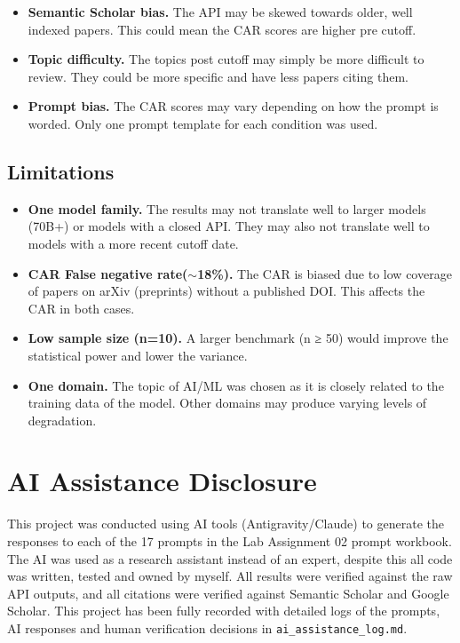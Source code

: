 \documentclass[conference]{IEEEtran}
\begin{document}
\begin{itemize}[leftmargin=,topsep=2pt]
\item \textbf{Semantic Scholar bias. } The API may be skewed towards older,
well indexed papers. This could mean the CAR scores are higher pre cutoff.
\item \textbf{Topic difficulty. } The topics post cutoff may simply be more difficult
to review. They could be more specific and have less papers citing them.
\item \textbf{Prompt bias. } The CAR scores may vary depending on how the prompt is worded.
Only one prompt template for each condition was used.
\end{itemize}

\subsection{Limitations}
\label{sec:limits}

\begin{itemize}[leftmargin=*,topsep=2pt]
\item \textbf{One model family. } The results may not translate well to larger models
(70B+) or models with a closed API. They may also not translate well to models
with a more recent cutoff date.
\item \textbf{CAR False negative rate($\sim$18\%). } The CAR is biased
due to low coverage of papers on arXiv (preprints) without a published DOI.
This affects the CAR in both cases.
\item \textbf{Low sample size (n=10). } A larger benchmark (n ≥ 50) would
improve the statistical power and lower the variance.
\item \textbf{One domain. } The topic of AI/ML was chosen as it is closely related
to the training data of the model. Other domains may produce varying levels
of degradation.
\end{itemize}

\section{AI Assistance Disclosure}
\label{sec:ai}
This project was conducted using AI tools (Antigravity/Claude) to generate
the responses to each of the 17 prompts in the Lab Assignment 02 prompt
workbook. The AI was used as a research assistant instead of an expert,
despite this all code was written, tested and owned by myself. All results
were verified against the raw API outputs, and all citations were
verified against Semantic Scholar and Google Scholar. This project has
been fully recorded with detailed logs of the prompts, AI responses and
human verification decisions in \texttt{ai\_assistance\_log.md}.
\end{document}
